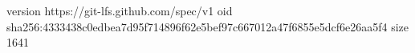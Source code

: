 version https://git-lfs.github.com/spec/v1
oid sha256:4333438c0edbea7d95f714896f62e5bef97c667012a47f6855e5dcf6e26aa5f4
size 1641
